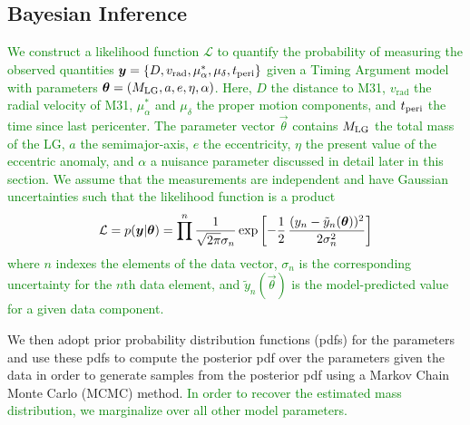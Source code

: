 \documentclass[twocolumn]{aastex631}
\newcommand{\add}[1]{\textcolor{green}{#1}}
\newcommand{\mlg}{\ensuremath{M_{\rm LG}}}
\newcommand{\vrad}{\ensuremath{v_\textrm{rad}}}
\begin{document}
\subsection{Bayesian Inference}
\label{sec:bayes}

\add{We construct a likelihood function $\mathcal{L}$ to quantify the probability of
measuring the observed quantities $\vec y = \{D, \vrad, \mu^*_{\alpha}, \mu_{\delta},
t_{\rm peri}\}$ given a Timing Argument model with parameters $\vec \theta = (\mlg, a,
e, \eta, \alpha)$.
Here, $D$ the distance to M31, $\vrad$ the radial velocity of M31, $\mu^*_{\alpha}$ and
$\mu_{\delta}$ the proper motion components, and $t_{\rm peri}$ the time since last
pericenter.
The parameter vector $\vec \theta$ contains $\mlg$ the total mass of the LG, $a$ the
semimajor-axis, $e$ the eccentricity, $\eta$ the present value of the eccentric anomaly,
and $\alpha$ a nuisance parameter discussed in detail later in this section.
We assume that the measurements are independent and have Gaussian uncertainties such
that the likelihood function is a product
\begin{equation}
  \mathcal{L} = p(\vec y|\vec \theta)\\=
  \prod^n \frac{1}{\sqrt{2\pi} \sigma_{n} } \exp\left[ -\frac{1}{2}\,\frac{(y_n - \tilde{y}_n(\vec{\theta}))^2}{2\sigma_n^2} \right]
\end{equation}
where $n$ indexes the elements of the data vector, $\sigma_{n}$ is the corresponding
uncertainty for the $n$th data element, and $\tilde{y}_n(\vec{\theta})$ is the
model-predicted value for a given data component.
}

We then adopt prior probability distribution functions (pdfs) for the parameters
and use these pdfs to compute the posterior pdf over the parameters given the
data in order to generate samples from the posterior pdf using a Markov Chain
Monte Carlo (MCMC) method.
\add{In order to recover the estimated mass distribution, we marginalize over
all other model parameters.}
\end{document}
